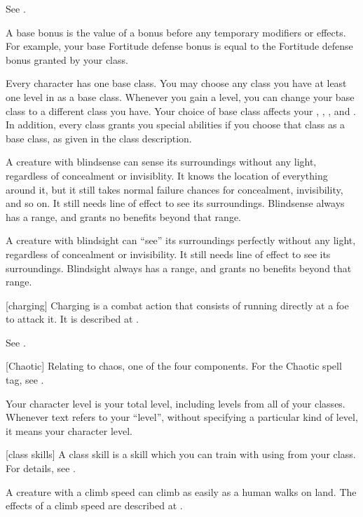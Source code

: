  See .

 A base bonus is the value of a bonus before any temporary modifiers or effects. For example, your base Fortitude defense bonus is equal to the Fortitude defense bonus granted by your class.

 Every character has one base class.
You may choose any class you have at least one level in as a base class.
Whenever you gain a level, you can change your base class to a different class you have.
Your choice of base class affects your , , , and .
In addition, every class grants you special abilities if you choose that class as a base class, as given in the class description.

 A creature with blindsense can sense its surroundings without any light, regardless of concealment or invisiblity.
It knows the location of everything around it, but it still takes normal failure chances for concealment, invisibility, and so on.
It still needs line of effect to see its surroundings.
Blindsense always has a range, and grants no benefits beyond that range.

 A creature with blindsight can ``see'' its surroundings perfectly without any light, regardless of concealment or invisibility.
It still needs line of effect to see its surroundings.
Blindsight always has a range, and grants no benefits beyond that range.

[charging] Charging is a combat action that consists of running directly at a foe to attack it.
It is described at .

 See .

[Chaotic] Relating to chaos, one of the four  components. For the Chaotic spell tag, see .

 Your character level is your total level, including levels from all of your classes.
Whenever text refers to your ``level'', without specifying a particular kind of level, it means your character level.

[class skills] A class skill is a skill which you can train with using  from your class. For details, see .

 A creature with a climb speed can climb as easily as a human walks on land.
The effects of a climb speed are described at .

